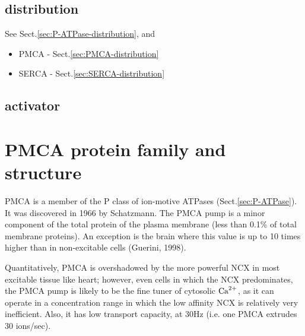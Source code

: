 \subsection{distribution}
\label{sec:Ca-ATPase-distribution}

See Sect.\ref{sec:P-ATPase-distribution}, and
\begin{itemize}
  \item PMCA - Sect.\ref{sec:PMCA-distribution}
  \item SERCA - Sect.\ref{sec:SERCA-distribution}
\end{itemize}

\subsection{activator}
\label{sec:Ca-ATPase-activator}


\section{PMCA protein family and structure}
\label{sec:PMCA}
\label{sec:pmca}

PMCA is a member of the P class of ion-motive ATPases
\citep{pedersen1987a,pedersen1987b} (Sect.\ref{sec:P-ATPase}).
It was discovered in 1966 by Schatzmann. 
The PMCA pump is a minor component of the total protein of the plasma membrane
(less than 0.1\% of total membrane proteins).
An exception is the brain where this value is up to 10 times higher than in
non-excitable cells (Guerini, 1998).

Quantitatively, PMCA is overshadowed by the more powerful NCX in most excitable
tissue like heart; however, even cells in which the NCX predominates, the PMCA
pump is likely to be the fine tuner of cytosolic ${\text{Ca}^{2+}}$, as it can operate in a
concentration range in which the low affinity NCX is relatively very
inefficient. Also, it has low transport capacity, at 30Hz (i.e. one PMCA
extrudes 30 ions/sec).

